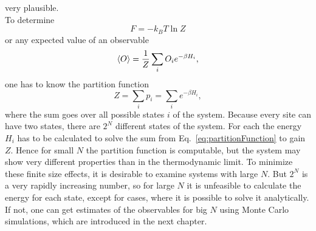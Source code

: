     very plausible.\\
    To determine
    \begin{equation}
        F=-k_{B}T \ln{Z}
    \end{equation}
    or any expected value of an observable
    \begin{equation}
        \left< O \right> = \frac{1}{Z} \sum_i O_i e^{-\beta H_i},
    \end{equation}
    one has to know the partition function
    \begin{equation}
        Z = \sum_i p_i = \sum_i e^{-\beta H_i},
        \label{eq:partitionFunction}
    \end{equation}
    where the sum goes over all possible states \(i\) of the system.
    Because every site can have two states, there are \(2^N\) different
    states of the system. For each the energy \(H_i\) has to be calculated
    to solve the sum from Eq.\ \eqref{eq:partitionFunction} to gain \(Z\).
    Hence for small \(N\) the partition function is computable, but the system
    may show very different properties than in the thermodynamic limit.
    To minimize these finite size effects, it is desirable to examine
    systems with large \(N\). But \(2^N\) is a very rapidly increasing
    number, so for large \(N\) it is unfeasible to calculate the energy for each state, except
    for cases, where it is possible to solve it analytically.\\
    If not, one can get estimates of the observables for big \(N\) using
    Monte Carlo simulations, which are introduced in the next chapter.\\


